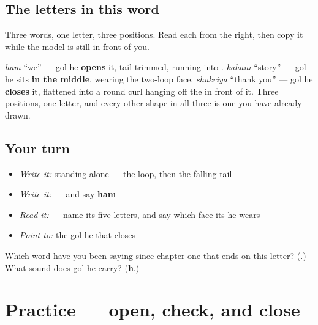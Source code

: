 \subsection*{The letters in this word}
Three words, one letter, three positions. Read each from the right, then copy it while the model is still in front of you.

\begin{quote}
\end{quote}

\begin{quote}
\end{quote}

\begin{quote}
\end{quote}

 \emph{ham} \textquotedblleft{}we\textquotedblright{} — gol he \textbf{opens} it, tail trimmed, running into \textbf{}.  \emph{kahānī} \textquotedblleft{}story\textquotedblright{} — gol he sits \textbf{in the middle}, wearing the two-loop face.  \emph{shukriya} \textquotedblleft{}thank you\textquotedblright{} — gol he \textbf{closes} it, flattened into a round curl hanging off the \textbf{} in front of it. Three positions, one letter, and every other shape in all three is one you have already drawn.

\subsection*{Your turn}
\begin{itemize}
\raggedright
  \item \emph{Write it:}  standing alone — the loop, then the falling tail
  \item \emph{Write it:}  — and say \textbf{ham}
  \item \emph{Read it:}  — name its five letters, and say which face its he wears
  \item \emph{Point to:} the gol he that closes \textbf{}
\end{itemize}

\begin{tcolorbox}[breakable,colback=teal!4,colframe=teal!35!black,title={Before you move on}]
Which word have you been saying since chapter one that ends on this letter? (\textbf{}.) What sound does gol he carry? (\textbf{h}.)
\end{tcolorbox}
\section[Practice]{Practice — open, check, and close}


